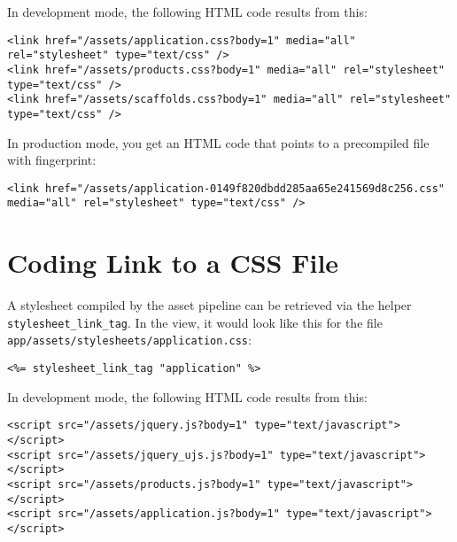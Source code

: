 \documentclass[a4paper]{book}
\begin{document}
In development mode, the following HTML code results from this:

\begin{shaded}\begin{verbatim}
<link href="/assets/application.css?body=1" media="all" rel="stylesheet" type="text/css" />
<link href="/assets/products.css?body=1" media="all" rel="stylesheet" type="text/css" />
<link href="/assets/scaffolds.css?body=1" media="all" rel="stylesheet" type="text/css" />
\end{verbatim}\end{shaded}

In production mode, you get an HTML code that points to a precompiled file with fingerprint:

\begin{shaded}\begin{verbatim}
<link href="/assets/application-0149f820dbdd285aa65e241569d8c256.css" media="all" rel="stylesheet" type="text/css" />
\end{verbatim}\end{shaded}

\section{Coding Link to a CSS File}\label{coding-link-to-a-css-file}

A stylesheet compiled by the asset pipeline can be retrieved via the helper \texttt{stylesheet\_link\_tag}. In the view, it would look like this for the file \texttt{app/assets/stylesheets/application.css}:

\begin{shaded}\begin{verbatim}
<%= stylesheet_link_tag "application" %>
\end{verbatim}\end{shaded}

In development mode, the following HTML code results from this:

\begin{shaded}\begin{verbatim}
<script src="/assets/jquery.js?body=1" type="text/javascript"></script>
<script src="/assets/jquery_ujs.js?body=1" type="text/javascript"></script>
<script src="/assets/products.js?body=1" type="text/javascript"></script>
<script src="/assets/application.js?body=1" type="text/javascript"></script>
\end{verbatim}\end{shaded}
\end{document}
